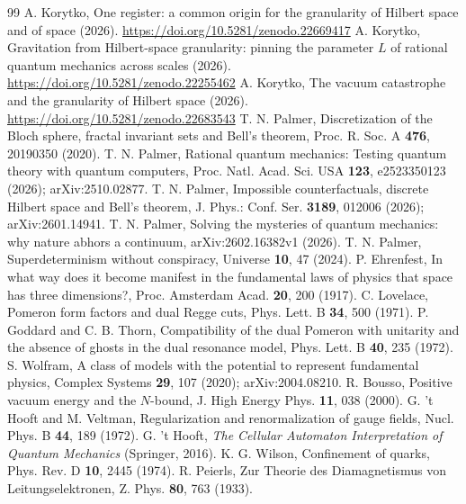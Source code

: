 \documentclass[aps,prd,twocolumn,superscriptaddress,nofootinbib]{revtex4-2}
\begin{document}
\begin{thebibliography}{99}
 A. Korytko, One register: a common origin for the granularity of Hilbert space and of space (2026). \mbox{\url{https://doi.org/10.5281/zenodo.22669417}}
 A. Korytko, Gravitation from Hilbert-space granularity: pinning the parameter $L$ of rational quantum mechanics across scales (2026). \mbox{\url{https://doi.org/10.5281/zenodo.22255462}}
 A. Korytko, The vacuum catastrophe and the granularity of Hilbert space (2026). \mbox{\url{https://doi.org/10.5281/zenodo.22683543}}
 T. N. Palmer, Discretization of the Bloch sphere, fractal invariant sets and Bell's theorem, Proc. R. Soc. A \textbf{476}, 20190350 (2020).
 T. N. Palmer, Rational quantum mechanics: Testing quantum theory with quantum computers, Proc. Natl. Acad. Sci. USA \textbf{123}, e2523350123 (2026); arXiv:2510.02877.
 T. N. Palmer, Impossible counterfactuals, discrete Hilbert space and Bell's theorem, J. Phys.: Conf. Ser. \textbf{3189}, 012006 (2026); arXiv:2601.14941.
 T. N. Palmer, Solving the mysteries of quantum mechanics: why nature abhors a continuum, arXiv:2602.16382v1 (2026).
 T. N. Palmer, Superdeterminism without conspiracy, Universe \textbf{10}, 47 (2024).
 P. Ehrenfest, In what way does it become manifest in the fundamental laws of physics that space has three dimensions?, Proc. Amsterdam Acad. \textbf{20}, 200 (1917).
 C. Lovelace, Pomeron form factors and dual Regge cuts, Phys. Lett. B \textbf{34}, 500 (1971).
 P. Goddard and C. B. Thorn, Compatibility of the dual Pomeron with unitarity and the absence of ghosts in the dual resonance model, Phys. Lett. B \textbf{40}, 235 (1972).
 S. Wolfram, A class of models with the potential to represent fundamental physics, Complex Systems \textbf{29}, 107 (2020); arXiv:2004.08210.
 R. Bousso, Positive vacuum energy and the $N$-bound, J. High Energy Phys. \textbf{11}, 038 (2000).
 G. 't Hooft and M. Veltman, Regularization and renormalization of gauge fields, Nucl. Phys. B \textbf{44}, 189 (1972).
 G. 't Hooft, \emph{The Cellular Automaton Interpretation of Quantum Mechanics} (Springer, 2016).
 K. G. Wilson, Confinement of quarks, Phys. Rev. D \textbf{10}, 2445 (1974).
 R. Peierls, Zur Theorie des Diamagnetismus von Leitungselektronen, Z. Phys. \textbf{80}, 763 (1933).

\end{thebibliography}
\end{document}

